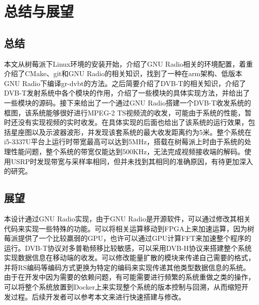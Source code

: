 \chapter{总结与展望}
	\section{总结}
	\par 本文从树莓派下Linux环境的安装开始，介绍了GNU Radio相关的环境配置，着重介绍了CMake、git和GNU Radio的相关知识，找到了一种在arm架构、低版本GNU Radio下编译gr-dvbt的方法。之后简要介绍了DVB-T的相关知识，介绍了DVB-T发射系统中各个模块的作用，介绍了一些模块的具体实现方法，并给出了一些模块的源码。接下来给出了一个通过GNU Radio搭建一个DVB-T收发系统的框图，该系统能够很好进行MPEG-2 TS视频流的收发，可能由于系统的性能，暂时还没有实现视频的实时收发。在具体实现的后面也给出了该系统的运行效果，包括星座图以及示波器波形，并发现该套系统的最大收发距离约为5米。整个系统在i5-3337U平台上运行时带宽最高可以达到5MHz，搭载在树莓派上时由于系统的处理性能问题，整个系统的带宽仅能达到500KHz，无法完成视频接收端的解码。使用USRP时发现带宽与采样率相同，但并未找到其相同的准确原因，有待更加深入的研究。
	\section{展望}
	\par 本设计通过GNU Radio实现，由于GNU Radio是开源软件，可以通过修改其相关代码来实现一些特殊的功能。可以将相关运算移动到FPGA上来加速运算，因为树莓派提供了一个比较羸弱的GPU，也许可以通过GPU计算FFT来加速整个程序的运行。DVB-T协议对多普勒频移比较敏感，可以采用DVB-H协议来搭建整个系统实现数据信息在移动端的收发。可以修改能量扩散的模块来传递自己需要的格式，并将RS编码等编码方式更换为特定的编码来实现传递其他类型数据信息的系统。由于在开发中因为需要的依赖问题，有可能需要进行频繁的系统重做之类的操作，可以将整个系统放置到Docker上来实现整个系统的版本控制与回溯，从而缩短开发过程。后续开发者可以参考本文来进行快速搭建与修改。